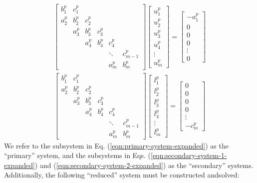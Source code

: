 \begin{align}
& \begin{bmatrix}
b_1^p & c_1^p \\
a_2^p & b_2^p & c_2^p \\
      & a_3^p & b_3^p & c_3^p \\
      &       & a_4^p & b_4^p & c_4^p \\
      &       &       &       &  \ddots & c_{m-1}^p\\
      &       &       &       &     a_{m}^p  & b_{m}^p
\end{bmatrix}
\begin{bmatrix}
u_1^p \\
u_2^p \\
u_3^p \\
u_4^p \\
\vdots \\
u_m^p
\end{bmatrix}
=
\begin{bmatrix}
-a_1^p \\
0 \\
0 \\
0 \\
\vdots \\
0
\end{bmatrix} & \label{eqn:secondary-system-1-expanded} 
\end{align}
%
\begin{align}
& \begin{bmatrix}
b_1^p & c_1^p \\
a_2^p & b_2^p & c_2^p \\
      & a_3^p & b_3^p & c_3^p \\
      &       & a_4^p & b_4^p & c_4^p \\
      &       &       &       &  \ddots & c_{m-1}^p\\
      &       &       &       &     a_{m}^p  & b_{m}^p
\end{bmatrix}
\begin{bmatrix}
l_1^p \\
l_2^p \\
l_3^p \\
l_4^p \\
\vdots \\
l_m^p
\end{bmatrix}
=
\begin{bmatrix}
0 \\
0 \\
0 \\
0 \\
\vdots \\
-c_m^p
\end{bmatrix} & \label{eqn:secondary-system-2-expanded}
\end{align}
%
We refer to the subsystem in Eq. (\ref{eqn:primary-system-expanded})
as the ``primary'' system,
and the subsystems in
Eqs. (\ref{eqn:secondary-system-1-expanded}) and
(\ref{eqn:secondary-system-2-expanded})
as the ``secondary'' systems.
Additionally, the following ``reduced'' system
must be constructed andsolved:

